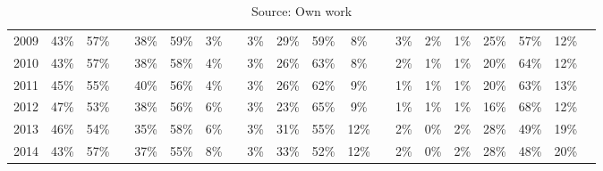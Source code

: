 \begin{table}[!ht]
\begin{tabular} {cccccccccccccccccccc}
2009 & 43\% & 57\% & & 38\% & 59\% & 3\% & & 3\% & 29\% & 59\% & 8\%  & & 3\% & 2\% & 1\% & 25\% & 57\% & 12\% \\ 
2010 & 43\% & 57\% & & 38\% & 58\% & 4\% & & 3\% & 26\% & 63\% & 8\%  & & 2\% & 1\% & 1\% & 20\% & 64\% & 12\% \\ 
2011 & 45\% & 55\% & & 40\% & 56\% & 4\% & & 3\% & 26\% & 62\% & 9\%  & & 1\% & 1\% & 1\% & 20\% & 63\% & 13\% \\ 
2012 & 47\% & 53\% & & 38\% & 56\% & 6\% & & 3\% & 23\% & 65\% & 9\%  & & 1\% & 1\% & 1\% & 16\% & 68\% & 12\% \\ 
2013 & 46\% & 54\% & & 35\% & 58\% & 6\% & & 3\% & 31\% & 55\% & 12\% & & 2\% & 0\% & 2\% & 28\% & 49\% & 19\% \\ 
2014 & 43\% & 57\% & & 37\% & 55\% & 8\% & & 3\% & 33\% & 52\% & 12\% & & 2\% & 0\% & 2\% & 28\% & 48\% & 20\% \\
   \bottomrule
\end{tabular}
\caption*{Source: Own work}
\end{table}

